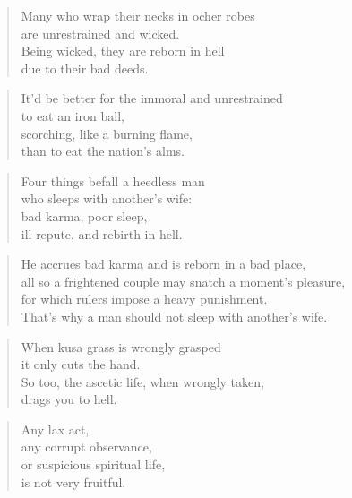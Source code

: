\documentclass[12pt,openany]{book}%
\begin{document}
\begin{verse}%
Many who wrap their necks in ocher robes \\
are unrestrained and wicked. \\
Being wicked, they are reborn in hell \\
due to their bad deeds. 

%
\end{verse}

\begin{verse}%
It’d be better for the immoral and unrestrained \\
to eat an iron ball, \\
scorching, like a burning flame, \\
than to eat the nation’s alms. 

%
\end{verse}

\begin{verse}%
Four things befall a heedless man \\
who sleeps with another’s wife: \\
bad karma, poor sleep, \\
ill-repute, and rebirth in hell. 

%
\end{verse}

\begin{verse}%
He accrues bad karma and is reborn in a bad place, \\
all so a frightened couple may snatch a moment’s pleasure, \\
for which rulers impose a heavy punishment. \\
That’s why a man should not sleep with another’s wife. 

%
\end{verse}

\begin{verse}%
When kusa grass is wrongly grasped \\
it only cuts the hand. \\
So too, the ascetic life, when wrongly taken, \\
drags you to hell. 

%
\end{verse}

\begin{verse}%
Any lax act, \\
any corrupt observance, \\
or suspicious spiritual life, \\
is not very fruitful. 

%
\end{verse}
\end{document}
